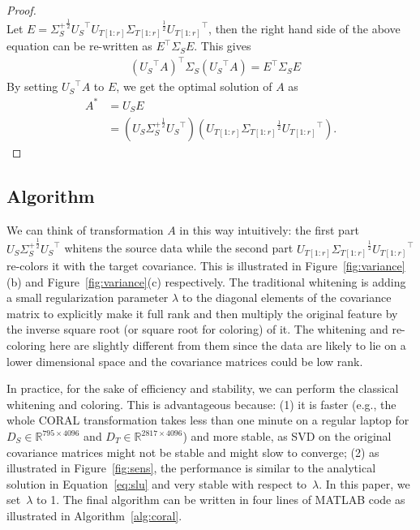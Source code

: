 \documentclass[letterpaper]{article}
\begin{document}
\begin{proof}
\begin{equation*}
\end{equation*}
Let $E ={\Sigma_S^{+}}^{\frac{1}{2}} {U_S}^{\top} {U_{T[1:r]}} {\Sigma_{T[1:r]}}^{\frac{1}{2}}{U_{T[1:r]}}^{\top}$, then the right hand side of the above equation can be re-written as ${E}^{\top}{\Sigma_S}E$. This gives
\begin{align*}
&{({U_S}^{\top}A)}^{\top}{\Sigma_S}({U_S}^{\top}{A})= {E}^{\top}{\Sigma_S}E
\end{align*}
By setting ${U_S}^{\top}A$ to $E$, we get the optimal solution of $A$ as 
\begin{equation} 
\begin{aligned}
A^{*}&={U_S}E\\
&=(U_{S}{\Sigma_S^{+}}^{\frac{1}{2}}{U_{S}}^{\top})(U_{T[1:r]}{\Sigma_{T[1:r]}}^{\frac{1}{2}}{U_{T[1:r]}}^{\top}).%
 \end{aligned}
\label{eq:slu}
\end{equation}
\end{proof}

\subsection{Algorithm}
\label{subsec:algo}
We can think of transformation $A$ in this way intuitively: the first part $U_{S}{\Sigma_S^{+}}^{\frac{1}{2}}{U_{S}}^{\top}$ whitens the source data while the second part $U_{T[1:r]}{\Sigma_{T[1:r]}}^{\frac{1}{2}}{U_{T[1:r]}}^{\top}$ re-colors it with the target covariance. This is illustrated in Figure~\ref{fig:variance}(b) and Figure~\ref{fig:variance}(c) respectively. The traditional whitening is adding a small regularization parameter $\lambda$ to the diagonal elements of the covariance matrix to explicitly make it full rank and then multiply the original feature by the inverse square root (or square root for coloring) of it. The whitening and re-coloring here are slightly different from them since the data are likely to lie on a lower dimensional space and the covariance matrices could be low rank. 

In practice, for the sake of efficiency and stability, we can perform the classical whitening and coloring. This is advantageous because: (1) 
it is faster (e.g., the whole CORAL transformation takes less than one minute on a regular laptop for $D_S\in\mathbb{R}^{795\times4096}$ and $D_T\in\mathbb{R}^{2817\times4096}$) and more stable, as SVD on the original covariance matrices might not be stable and might slow to converge; (2) as illustrated in Figure~\ref{fig:sens}, the performance is similar to the analytical solution in Equation~\eqref{eq:slu} and very stable with respect to~$\lambda$. In this paper, we set~$\lambda$ to 1. The final algorithm can be written in four lines of MATLAB code as illustrated in Algorithm~\ref{alg:coral}.
 
\end{document}
